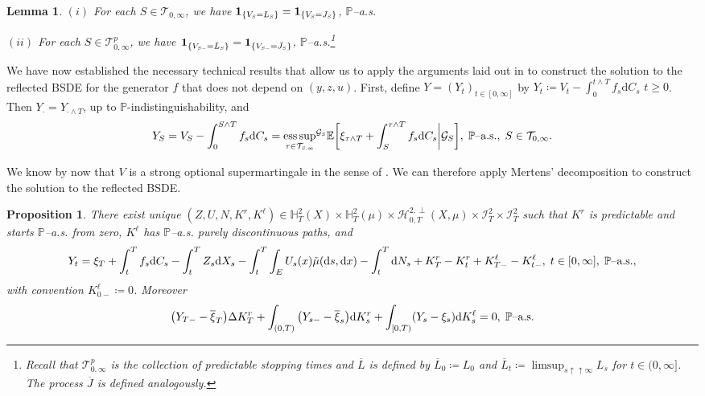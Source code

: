 \documentclass[10pt]{article} %
\newtheorem{lemma}[theorem]{Lemma}
\newtheorem{proposition}[theorem]{Proposition}
\newcommand\cG{\mathcal G}
\newcommand\cH{\mathcal H}
\newcommand\cI{\mathcal I}
\newcommand\cT{\mathcal T}
\newcommand{\smalltext}[1]{\text{\fontsize{4}{4}\selectfont$#1$}}
\def \E{\mathbb{E}}
\def \H{\mathbb{H}}
\def \P{\mathbb{P}}
\newcommand{\1}{\mathbf{1}}
\def\d{\mathrm{d}}
\DeclareMathOperator*{\esssup}{ess\,sup}
\begin{document}
\begin{lemma}\label{lem::snell_indicator}
	$(i)$ For each $S \in \cT_{0,\infty}$, we have $\mathbf{1}_{\{V_\smalltext{S} = L_\smalltext{S}\}} = \mathbf{1}_{\{V_\smalltext{S} = J_\smalltext{S}\}}$, $\P${\rm--a.s.}
	
	\medskip
	$(ii)$ For each $S \in \cT^p_{0,\infty}$, we have $\mathbf{1}_{\{V_{\smalltext{S}\smalltext{-}} = \bar L_\smalltext{S}\}} = \mathbf{1}_{\{V_{\smalltext{S}\smalltext{-}} = \bar J_\smalltext{S}\}}$, $\P${\rm--a.s.}\footnote{Recall that $\cT^p_{0,\infty}$ is the collection of predictable stopping times and $\overline L$ is defined by $\overline L_0 \coloneqq L_0$ and $\overline L_t \coloneqq \limsup_{s \uparrow\uparrow \infty} L_s$ for $t \in (0,\infty]$. The process $\overline J$ is defined analogously.}
\end{lemma}


	
We have now established the necessary technical results that allow us to apply the arguments laid out in \cite{grigorova2020optimal} to construct the solution to the reflected BSDE for the generator $f$ that does not depend on $(y,z,u)$. First, define $Y = (Y_t)_{t \in [0,\infty]}$ by $Y_t \coloneqq V_t - \int_0^{t \land T} f_s \d C_s$ $t\geq 0$. Then $Y_\cdot = Y_{\cdot \land T}$, up to $\P$-indistinguishability, and
\begin{equation*}
	Y_S = V_S - \int_0^{S \land T} f_s \d C_s = {\esssup_{\tau \in \cT_{\smalltext{S}\smalltext{,}\smalltext{\infty}}}}^{\cG_\smalltext{S}} \E\bigg[\xi_{\tau \land T} + \int_S^{\tau \land T} f_s \d C_s \bigg| \cG_S\bigg], \; \text{$\P$--a.s.}, \; S \in \cT_{0,\infty}.
\end{equation*}

We know by now that $V$ is a strong optional supermartingale in the sense of \cite[Appendix I]{dellacherie1982probabilities}. We can therefore apply Mertens' decomposition to construct the solution to the reflected BSDE.

\begin{proposition}\label{lem::snell_decomposition}
	There exist unique $(Z,U,N,K^r,K^\ell) \in \H^2_T(X) \times \H^2_T(\mu) \times \cH^{2,\perp}_{0,T}(X,\mu) \times \cI^2_T \times \cI^2_T$ such that $K^r$ is predictable and starts $\P$--{\rm a.s.} from zero, $K^\ell$ has $\P$--{\rm a.s.} purely discontinuous paths, and
		\begin{equation*}
			Y_t = \xi_T + \int_t^T f_s \d C_s - \int_t^T Z_s\d X_s - \int_t^T\int_E U_s(x)\tilde\mu(\d s, \d x) - \int_t^T \d N_s + K^r_T - K^r_t + K^\ell_{T-} - K^\ell_{t-}, \; t \in [0,\infty], \; \text{$\P${\rm--a.s.}},
		\end{equation*}
		with convention $K^\ell_{0-}\coloneqq 0$. Moreover
	\[
		 \big(Y_{T-} - \overline{\xi}_T\big) \Delta K^r_T + \int_{(0,T)} \big(Y_{s-} - \overline{\xi}_s\big) \d K^r_s + \int_{[0,T)} (Y_s - \xi_s) \d K^\ell_s = 0, \;\text{$\P$\rm--a.s.}
	\]
\end{proposition}
\end{document}
